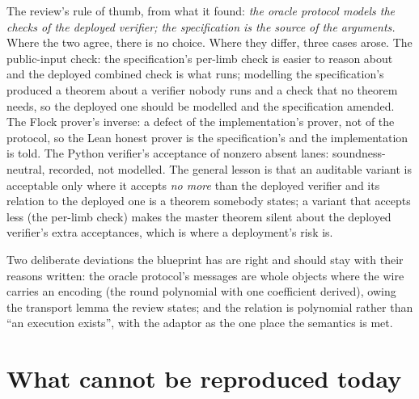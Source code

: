 The review's rule of thumb, from what it found: \emph{the oracle protocol models the checks
of the deployed verifier; the specification is the source of the arguments.} Where the two
agree, there is no choice. Where they differ, three cases arose. The public-input check: the
specification's per-limb check is easier to reason about and the deployed combined check is
what runs; modelling the specification's produced a theorem about a verifier nobody runs and a
check that no theorem needs, so the deployed one should be modelled and the specification
amended. The Flock prover's inverse: a defect of the implementation's prover, not of the
protocol, so the Lean honest prover is the specification's and the implementation is told. The
Python verifier's acceptance of nonzero absent lanes: soundness-neutral, recorded, not
modelled. The general lesson is that an auditable variant is acceptable only where it accepts
\emph{no more} than the deployed verifier and its relation to the deployed one is a theorem
somebody states; a variant that accepts less (the per-limb check) makes the master theorem
silent about the deployed verifier's extra acceptances, which is where a deployment's risk is.

Two deliberate deviations the blueprint has are right and should stay with their reasons
written: the oracle protocol's messages are whole objects where the wire carries an encoding
(the round polynomial with one coefficient derived), owing the transport lemma the review
states; and the relation is polynomial rather than \enquote{an execution exists}, with the
adaptor as the one place the semantics is met.

\section{What cannot be reproduced today}\label{sec:opt-upstream}

